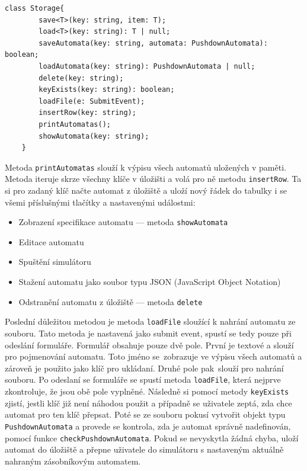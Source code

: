 \begin{lstlisting}[label=src:StorageClass, caption={Třída Storage}]
    class Storage{
        save<T>(key: string, item: T);
        load<T>(key: string): T | null;
        saveAutomata(key: string, automata: PushdownAutomata): boolean;
        loadAutomata(key: string): PushdownAutomata | null;
        delete(key: string);
        keyExists(key: string): boolean;
        loadFile(e: SubmitEvent);
        insertRow(key: string);
        printAutomatas();
        showAutomata(key: string);
    }
\end{lstlisting}

Metoda \texttt{printAutomatas} slouží k výpisu všech automatů uložených v paměti. Metoda iteruje skrze všechny klíče v úložišti a volá pro ně metodu \texttt{insertRow}. Ta si pro zadaný klíč načte automat z úložiště a uloží nový řádek do tabulky i se všemi příslušnými tlačítky a nastavenými událostmi:
\begin{itemize}
    \item Zobrazení specifikace automatu --- metoda \texttt{showAutomata}
    \item Editace automatu
    \item Spuštění simulátoru
    \item Stažení automatu jako soubor typu JSON (JavaScript Object Notation)
    \item Odstranění automatu z úložiště --- metoda \texttt{delete}
\end{itemize}


Poslední důležitou metodou je metoda \texttt{loadFile} sloužící k nahrání automatu ze souboru. Tato metoda je nastavená jako submit event, spustí se tedy pouze při odeslání formuláře. Formulář obsahuje pouze dvě pole. První je textové a slouží pro pojmenování automatu. Toto jméno se~zobrazuje ve výpisu všech automatů a zároveň je použito jako klíč pro ukládaní. Druhé pole pak~slouží pro nahrání souboru. Po odeslaní se formuláře se spustí metoda \texttt{loadFile}, která nejprve zkontroluje, že jsou obě pole vyplněné. Následně si pomocí metody \texttt{keyExists} zjistí, jestli klíč již není náhodou použit a případně se uživatele zeptá, zda chce automat pro ten klíč přepsat. Poté se ze souboru pokusí vytvořit objekt typu \texttt{PushdownAutomata} a provede se kontrola, zda je automat správně nadefinován, pomocí funkce \texttt{checkPushdownAutomata}. Pokud se nevyskytla žádná chyba, uloží automat do úložiště a přepne uživatele do simulátoru s nastaveným aktuálně nahraným zásobníkovým automatem.

